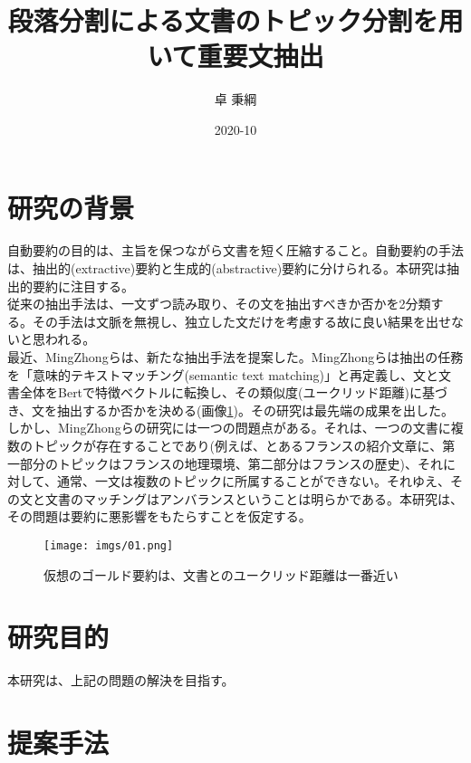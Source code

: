 \documentclass[a4paper]{article}
\title{段落分割による文書のトピック分割を用いて重要文抽出}
\date{2020-10}
\author{卓 秉綱}
\begin{document}
\maketitle

\section{研究の背景}

自動要約の目的は、主旨を保つながら文書を短く圧縮すること。自動要約の手法は、抽出的(extractive)要約と生成的(abstractive)要約に分けられる。本研究は抽出的要約に注目する。\\

従来の抽出手法は、一文ずつ読み取り、その文を抽出すべきか否かを2分類する。その手法は文脈を無視し、独立した文だけを考慮する故に良い結果を出せないと思われる。\\

最近、MingZhongらは、新たな抽出手法を提案した。MingZhongらは抽出の任務を「意味的テキストマッチング(semantic text matching)」と再定義し、文と文書全体をBertで特徴ベクトルに転換し、その類似度(ユークリッド距離)に基づき、文を抽出するか否かを決める(画像\ref{fig:img1})。その研究は最先端の成果を出した。\\

しかし、MingZhongらの研究には一つの問題点がある。それは、一つの文書に複数のトピックが存在することであり(例えば、とあるフランスの紹介文章に、第一部分のトピックはフランスの地理環境、第二部分はフランスの歴史)、それに対して、通常、一文は複数のトピックに所属することができない。それゆえ、その文と文書のマッチングはアンバランスということは明らかである。本研究は、その問題は要約に悪影響をもたらすことを仮定する。\\

\begin{figure}
  \texttt{[image: imgs/01.png]}
  \caption{仮想のゴールド要約は、文書とのユークリッド距離は一番近い}
  \label{fig:img1}
\end{figure}

\section{研究目的}

本研究は、上記の問題の解決を目指す。\\

\section{提案手法}
\end{document}
